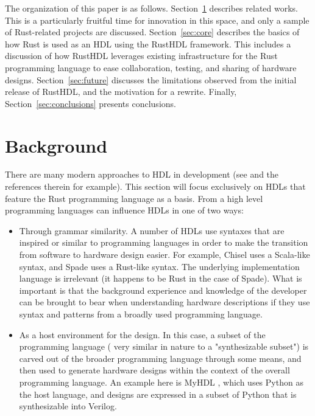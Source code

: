 \documentclass[conference]{IEEEtran}
\begin{document}
The organization of this paper is as follows.  Section~\ref{sec:related} describes related
works.  This is a particularly fruitful time for innovation in this space, and only a
sample of Rust-related projects are discussed. Section~\ref{sec:core} describes the 
basics of how Rust is used as an HDL using the RustHDL
framework.  This includes a discussion of how RustHDL leverages existing infrastructure 
for the Rust programming language to ease collaboration, testing, and sharing of hardware 
designs.  Section~\ref{sec:future} discusses the limitations observed from the initial
release of RustHDL, and the motivation for a rewrite.  Finally, Section~\ref{sec:conclusions}
presents conclusions.

\section{Background}\label{sec:related}

There are many modern approaches to HDL in development (see \cite{b1} and the references therein for example).  
This section will focus exclusively on HDLs that feature the Rust programming language as a basis.
From a high level programming languages can influence HDLs in one of two ways:

\begin{itemize}
  \item Through grammar similarity.  A number of HDLs use syntaxes that are inspired or similar to
  programming languages in order to make the transition from software to hardware design easier.
  For example, Chisel \cite{b2} uses a Scala-like syntax, and Spade \cite{b1} uses a Rust-like syntax.
  The underlying implementation language is irrelevant (it happens to be Rust in the case of Spade).
  What is important is that the background experience and knowledge of the developer can be brought 
  to bear when understanding hardware descriptions if they use syntax and patterns from a broadly
  used programming language.
  \item As a host environment for the design.  In this case, a subset of the programming language (
    very similar in nature to a "synthesizable subset") is carved out of the broader programming language
    through some means, and then used to generate hardware designs within the context of the overall
    programming language.  An example here is MyHDL \cite{b3}, which uses Python as the host language, and 
    designs are expressed in a subset of Python that is synthesizable into Verilog.
\end{itemize}
\end{document}

